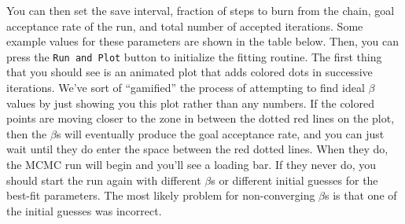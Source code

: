 \documentclass[a4paper]{article}
\newcommand{\code}[1]{\texttt{#1}}
\begin{document}
You can then set the save interval, fraction of steps to burn from the chain, goal acceptance rate of the run, and total number of accepted iterations. Some example values for these parameters are shown in the table below. Then, you can press the \code{Run and Plot} button to initialize the fitting routine. The first thing that you should see is an animated plot that adds colored dots in successive iterations. We've sort of ``gamified'' the process of attempting to find ideal $\beta$ values by just showing you this plot rather than any numbers. If the colored points are moving closer to the zone in between the dotted red lines on the plot, then the $\beta$s will eventually produce the goal acceptance rate, and you can just wait until they do enter the space between the red dotted lines. When they do, the MCMC run will begin and you'll see a loading bar. If they never do, you should start the run again with different $\beta$s or different initial guesses for the best-fit parameters. The most likely problem for non-converging $\beta$s is that one of the initial guesses was incorrect. 
\end{document}
